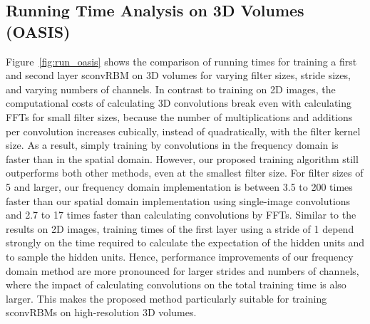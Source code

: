 \subsection{Running Time Analysis on 3D Volumes (OASIS)}

Figure~\ref{fig:run_oasis} shows the comparison of running times for training a
first  and second layer sconvRBM on 3D volumes for varying filter sizes, stride
sizes, and varying numbers of channels. In contrast to training on 2D images,
the computational costs of calculating 3D convolutions break even with
calculating FFTs for small filter sizes, because the number of multiplications
and additions per convolution increases cubically, instead of quadratically,
with the filter kernel size. As a result, simply training by convolutions in the
frequency domain is faster than in the spatial domain. However, our proposed
training algorithm still outperforms both other methods, even at the smallest
filter size. For filter sizes of 5 and larger, our frequency domain
implementation is between 3.5 to 200 times faster than our spatial domain
implementation using single-image convolutions and 2.7 to 17 times faster than
calculating convolutions by FFTs. Similar to the results on 2D images, training
times of the first layer using a stride of 1 depend strongly on the time
required to calculate the expectation of the hidden units and to sample the
hidden units. Hence, performance improvements of our frequency domain method are
more pronounced for larger strides and numbers of channels, where the impact of
calculating convolutions on the total training time is also larger. This makes
the proposed method particularly suitable for training sconvRBMs on
high-resolution 3D volumes.


